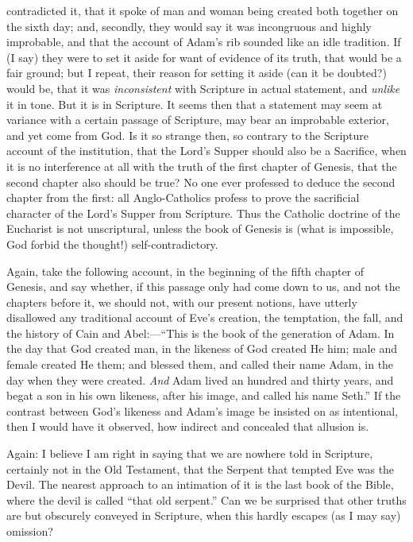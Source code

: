 contradicted it, that it spoke of man and woman being created both
together on the sixth day; and, secondly, they would say it was
incongruous and highly improbable, and that the account of Adam's rib
sounded like an idle tradition. If (I say) they were to set it aside
for want of evidence of its truth, that would be a fair ground; but I
repeat, their reason for setting it aside (can it be doubted?) would
be, that it was \emph{inconsistent} with Scripture in actual
statement, and \emph{unlike} it in tone. But it is in Scripture. It
seems then that a statement may seem at variance with a certain
passage of Scripture, may bear an improbable exterior, and yet come
from God. Is it so strange then, so contrary to the Scripture account
of the institution, that the Lord's Supper should also be a Sacrifice,
when it is no interference at all with the truth of the first chapter
of Genesis, that the second chapter also should be true? No one ever
professed to deduce the second chapter from the first: all
Anglo-Catholics profess to prove the sacrificial character of the Lord's
Supper from Scripture. Thus the Catholic doctrine of the Eucharist is
not unscriptural, unless the book of Genesis is (what is impossible,
God forbid the thought!) self-contradictory.

Again, take the following account, in the beginning of the fifth
chapter of Genesis, and say whether, if this passage only had come
down to us, and not the chapters before it, we should not, with our
present notions, have utterly disallowed any traditional account of
Eve's creation, the temptation, the fall, and the history of
Cain and Abel:—``This is the book of the generation of Adam. In
the day that God created man, in the likeness of God created He him;
male and female created He them; and blessed them, and called their
name Adam, in the day when they were created. \emph{And} Adam lived an
hundred and thirty years, and begat a son in his own likeness, after
his image, and called his name Seth.'' If the contrast between God's
likeness and Adam's image be insisted on as intentional, then I would
have it observed, how indirect and concealed that allusion is.

Again: I believe I am right in saying that we are nowhere told in
Scripture, certainly not in the Old Testament, that the Serpent that
tempted Eve was the Devil. The nearest approach to an intimation of it
is the last book of the Bible, where the devil is called ``that
old serpent.'' Can we be surprised that other truths are but
obscurely conveyed in Scripture, when this hardly escapes (as I may
say) omission?

